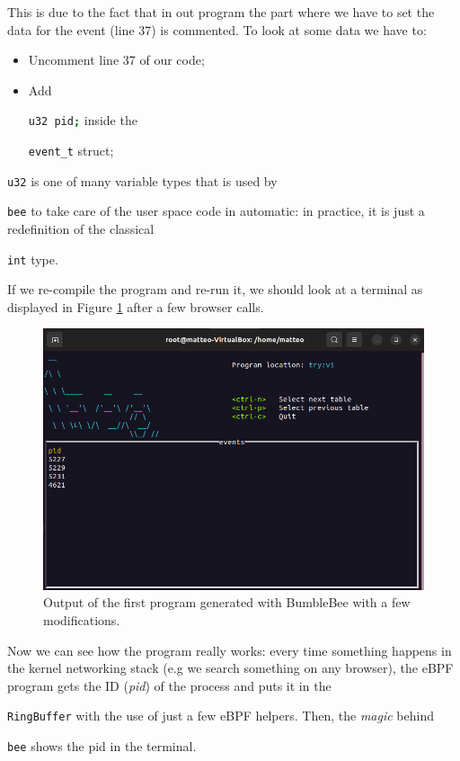 This is due to the fact that in out program the part where we have to set the data for the event (line 37) is commented.
To look at some data we have to:

\begin{itemize}
	\item 
		Uncomment line 37 of our code;
	\item 
		Add \raggedright\colorbox{backcolour}{\lstinline[style=commandline, language=bash]|u32 pid;|} inside the \raggedright\colorbox{backcolour}{\lstinline[style=commandline, language=bash]|event_t|} struct;
\end{itemize}

\raggedright\colorbox{backcolour}{\lstinline[style=commandline, language=bash]|u32|} is one of many variable types that is used by \raggedright\colorbox{backcolour}{\lstinline[style=commandline, language=bash]|bee|} to take care of the user space code in automatic: in practice, it is just a redefinition of the classical \raggedright\colorbox{backcolour}{\lstinline[style=commandline, language=bash]|int|} type.

If we re-compile the program and re-run it, we should look at a terminal as displayed in Figure \ref{fig:bee_modified_first_program_output} after a few browser calls.

\begin{figure}[h]
	\centering
	\includegraphics[width=0.7\linewidth]{images/LinuxDevelopment/n_rb_p_working_display.png}
	\caption{Output of the first program generated with BumbleBee with a few modifications.}
	\label{fig:bee_modified_first_program_output}
\end{figure}

Now we can see how the program really works: every time something happens in the kernel networking stack (e.g we search something on any browser), the eBPF program gets the ID (\textit{pid}) of the process and puts it in the \raggedright\colorbox{backcolour}{\lstinline[style=commandline, language=bash]|RingBuffer|} with the use of just a few eBPF helpers.
Then, the \textit{magic} behind \raggedright\colorbox{backcolour}{\lstinline[style=commandline, language=bash]|bee|} shows the pid in the terminal.

